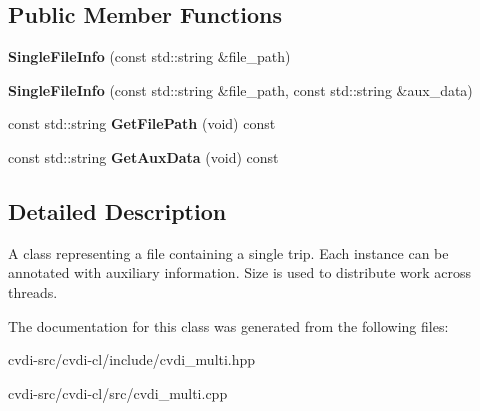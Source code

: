 \subsection*{Public Member Functions}
\begin{DoxyCompactItemize}
\item 
{\bfseries Single\+File\+Info} (const std\+::string \&file\+\_\+path)\hypertarget{classcvdi__multi_1_1SingleFileInfo_a3e05eee2e82576152680ac371a9b5a29}{}\label{classcvdi__multi_1_1SingleFileInfo_a3e05eee2e82576152680ac371a9b5a29}

\item 
{\bfseries Single\+File\+Info} (const std\+::string \&file\+\_\+path, const std\+::string \&aux\+\_\+data)\hypertarget{classcvdi__multi_1_1SingleFileInfo_a2e1b3e509271a53d1ea4ebe397b09c4b}{}\label{classcvdi__multi_1_1SingleFileInfo_a2e1b3e509271a53d1ea4ebe397b09c4b}

\item 
const std\+::string {\bfseries Get\+File\+Path} (void) const \hypertarget{classcvdi__multi_1_1SingleFileInfo_a7cd6386fb29f39cd32aab573619c7704}{}\label{classcvdi__multi_1_1SingleFileInfo_a7cd6386fb29f39cd32aab573619c7704}

\item 
const std\+::string {\bfseries Get\+Aux\+Data} (void) const \hypertarget{classcvdi__multi_1_1SingleFileInfo_a3792837adc62d140288c280ac2829356}{}\label{classcvdi__multi_1_1SingleFileInfo_a3792837adc62d140288c280ac2829356}

\end{DoxyCompactItemize}


\subsection{Detailed Description}
A class representing a file containing a single trip. Each instance can be annotated with auxiliary information. Size is used to distribute work across threads. 

The documentation for this class was generated from the following files\+:\begin{DoxyCompactItemize}
\item 
cvdi-\/src/cvdi-\/cl/include/cvdi\+\_\+multi.\+hpp\item 
cvdi-\/src/cvdi-\/cl/src/cvdi\+\_\+multi.\+cpp\end{DoxyCompactItemize}
